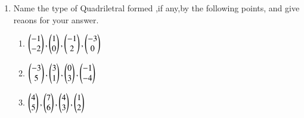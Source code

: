 \renewcommand{\theequation}{\theenumi}
\begin{enumerate}[label=\arabic*.,ref=\thesubsection.\theenumi]

\item Name the type of Quadriletral formed ,if any,by the following points, and give reaons for your answer.


\begin{enumerate}[label = (\alph*)]
	\item
	$\begin{pmatrix}-1\\-2\end{pmatrix} ,\begin{pmatrix}1\\0\end{pmatrix} ,\begin{pmatrix}-1\\2\end{pmatrix} ,\begin{pmatrix}-3\\0\end{pmatrix}$
	\item
	$\begin{pmatrix}-3\\5\end{pmatrix} ,\begin{pmatrix}3\\1\end{pmatrix} ,\begin{pmatrix}0\\3\end{pmatrix} ,\begin{pmatrix}-1\\-4\end{pmatrix}$
	\item
	$\begin{pmatrix}4\\5\end{pmatrix} ,\begin{pmatrix}7\\6\end{pmatrix} ,\begin{pmatrix}4\\3\end{pmatrix} ,\begin{pmatrix}1\\2\end{pmatrix}$
	
\end{enumerate}
\end{enumerate}